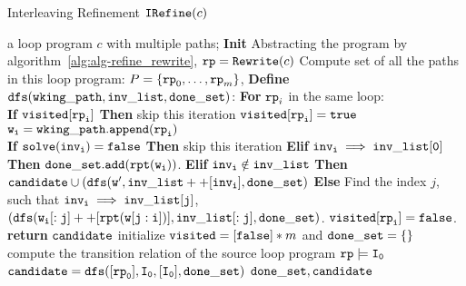 

  \begin{algorithm}
    \caption{
    {Interleaving Refinement $\mathtt{IRefine}(c)$}
    }
    \label{alg:prog-refine}
    \begin{algorithmic}[1]
    \REQUIRE a loop program $c$ with multiple paths;
    \STATE  \textbf{Init} 
    \STATE Abstracting the program by algorithm~\ref{alg:alg-refine_rewrite},  $\mathtt{rp} = \mathtt{Rewrite}(c)$
    \STATE  Compute set of all the paths in this loop program:
    $P = \{\mathtt{rp}_0, \ldots, \mathtt{rp}_m\}$,
    \STATE \textbf{Define} {$\mathtt{dfs(wking\_path, inv\_list, done\_set)}$:}
    \STATE {}
    \STATE {}
    \STATE \quad \textbf{For} $\mathtt{rp}_i$ in the same loop:
    \\
    \STATE \quad \quad \textbf{If} {$\mathtt{visited[\mathtt{rp}_i]}$} \textbf{Then} skip this iteration
    \STATE \quad \quad $\mathtt{visited[\mathtt{rp}_i]} = \mathtt{true}$
    \STATE \quad \quad $\mathtt{w_i = wking\_path.append(\mathtt{rp}_i)}$
    \\
    \quad {}
    \STATE \quad \quad \textbf{If} {$\mathtt{solve(inv_i) = \mathtt{false}}$} \textbf{Then} skip this iteration
    \STATE \quad \quad \textbf{Elif} {$\mathtt{inv_i \implies inv\_list[0]}$} \textbf{Then}  $\mathtt{done\_set.add(\mathtt{rpt}(w_i))}$.
    \STATE \quad \quad \textbf{Elif} {$\mathtt{inv_i \notin inv\_list}$} \textbf{Then} 
    $\mathtt{candidate \cup (dfs(w', inv\_list++[inv_i], done\_set)}$
    \STATE \quad \quad \textbf{Else} 
    Find the index $j$, such that $\mathtt{inv_i \implies inv\_list[j] }$,
    \STATE \quad \quad \quad
    $\mathtt{(dfs(w_i[:j]++[\mathtt{rpt}(w[j:i])], inv\_list[:j], done\_set)}$.
    \STATE \quad \quad $\mathtt{visited[\mathtt{rp}_i]} = \mathtt{false}$.
    \STATE \quad \textbf{return} $\mathtt{candidate}$
    \STATE initialize $\mathtt{visited} = [\mathtt{false}]*m$ and $\mathtt{done\_set = \{\}}$
    \STATE compute the transition relation of the source loop program $\mathtt{rp} \models \mathtt{I_0}$
    \STATE $\mathtt{candidate = dfs([\mathtt{rp}_0], I_0, [I_0], done\_set )}$
    \RETURN $\mathtt{done\_set, candidate}$
    \end{algorithmic}
    \end{algorithm}



